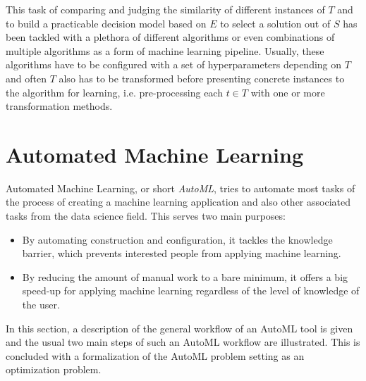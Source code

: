 This task of comparing and judging the similarity of different instances of $T$ and to build a practicable decision model based on $E$ to select a solution out of $S$ has been tackled with a plethora of different algorithms or even combinations of multiple algorithms as a form of machine learning pipeline.
Usually, these algorithms have to be configured with a set of hyperparameters depending on $T$ and often $T$ also has to be transformed before presenting concrete instances to the algorithm for learning, i.e. pre-processing each $t\in T$ with one or more transformation methods.

\section{Automated Machine Learning}
\label{sec:theory:automl}
Automated Machine Learning, or short \textit{AutoML}, tries to automate most tasks of the process of creating a machine learning application and also other associated tasks from the data science field.
This serves two main purposes:
\begin{itemize}
    \item By automating construction and configuration, it tackles the knowledge barrier, which prevents interested people from applying machine learning.
    \item By reducing the amount of manual work to a bare minimum, it offers a big speed-up for applying machine learning regardless of the level of knowledge of the user.
\end{itemize}
In this section, a description of the general workflow of an AutoML tool is given and the usual two main steps of such an AutoML workflow are illustrated.
This is concluded with a formalization of the AutoML problem setting as an optimization problem.

